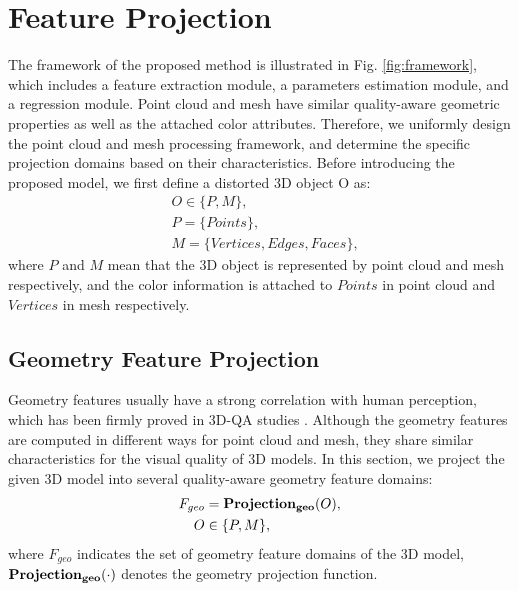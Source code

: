 \documentclass[lettersize,journal]{IEEEtran}
\begin{document}
\section{Feature Projection}
\label{sec:feature projection}
The framework of the proposed method is illustrated in Fig. \ref{fig:framework}, which includes a feature extraction module, a parameters estimation module, and a regression module. Point cloud and mesh have similar quality-aware geometric properties as well as the attached color attributes. Therefore, we uniformly design the point cloud and mesh processing framework, and determine the specific projection domains based on their characteristics.
Before introducing the proposed model, we first define a distorted 3D object O as:
\begin{equation}
\begin{aligned}
& O \in \{P, M\},\\
& P=\{Points\},\\
& M=\{Vertices, Edges, Faces\},
\end{aligned}
\end{equation}
where $P$ and $M$ mean that the 3D object is represented by point cloud and mesh respectively, and the color information is attached to $Points$ in point cloud and $Vertices$ in mesh respectively.


\subsection{Geometry Feature Projection}
Geometry features usually have a strong correlation with human perception, which has been firmly proved in 3D-QA studies \cite{p2point, p2plane, m1,ff2_roughness, p2mesh,angular,pcqa2,dame}. Although the geometry features are computed in different ways for point cloud and mesh, they share similar characteristics for the visual quality of 3D models. In this section, we project the given 3D model into several quality-aware geometry feature domains:
\begin{equation}
\begin{aligned}
    F_{geo} & = \boldsymbol{\rm{Projection_{geo}}}(O),\\
    O & \in \{P, M\},
\end{aligned}
\end{equation}
where $F_{geo}$ indicates the set of geometry feature domains of the 3D model, $\boldsymbol{\rm{Projection_{geo}}}(\cdot)$ denotes the geometry projection function.
\end{document}

